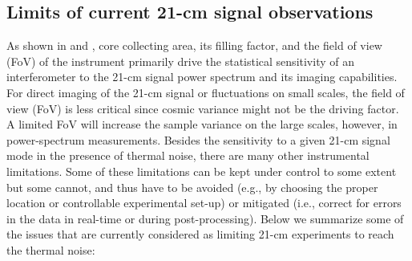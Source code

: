 \subsection{Limits of current 21-cm signal observations}

As shown in \cite{mellema13} and \cite{koopmans15}, core collecting area, its filling factor, and the field of view (FoV) of the instrument primarily drive the statistical sensitivity of an interferometer to the 21-cm signal power spectrum and its imaging capabilities. For direct imaging of the 21-cm signal or fluctuations on small scales, the field of view (FoV) is less critical since cosmic variance might not be the driving factor. A limited FoV will increase the sample variance on the large scales, however, in power-spectrum measurements. Besides the sensitivity to a given 21-cm signal mode in the presence of thermal noise, there are many other instrumental limitations. Some of these limitations can be kept under control to some extent but some cannot, and thus have to be avoided (e.g., by choosing the proper location or controllable experimental set-up) or mitigated (i.e., correct for errors in the data in real-time or during post-processing).
%
Below we summarize some of the issues that are currently considered as limiting 21-cm experiments to reach the thermal noise:
%
